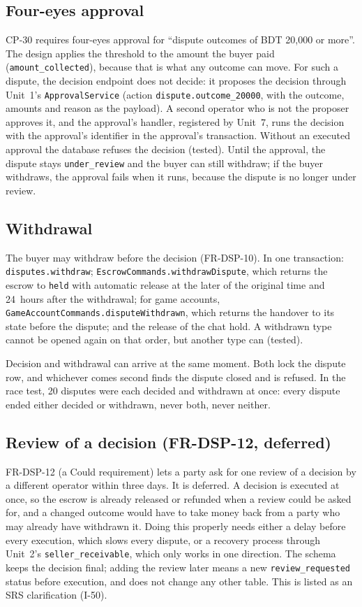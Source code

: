 \documentclass[11pt,a4paper]{article}
\begin{document}
\subsection{Four-eyes approval}
\label{sec:foureyes}
CP-30 requires four-eyes approval for ``dispute outcomes of BDT 20{,}000 or more''. The design applies the threshold to the amount the buyer paid (\texttt{amount\_collected}), because that is what any outcome can move. For such a dispute, the decision endpoint does not decide: it proposes the decision through Unit~1's \texttt{ApprovalService} (action \texttt{dispute.outcome\_20000}, with the outcome, amounts and reason as the payload). A second operator who is not the proposer approves it, and the approval's handler, registered by Unit~7, runs the decision with the approval's identifier in the approval's transaction. Without an executed approval the database refuses the decision (tested). Until the approval, the dispute stays \texttt{under\_review} and the buyer can still withdraw; if the buyer withdraws, the approval fails when it runs, because the dispute is no longer under review.

\subsection{Withdrawal}
The buyer may withdraw before the decision (FR-DSP-10). In one transaction: \texttt{disputes.withdraw}; \texttt{EscrowCommands.\allowbreak withdrawDispute}, which returns the escrow to \texttt{held} with automatic release at the later of the original time and 24~hours after the withdrawal; for game accounts, \texttt{GameAccountCommands.disputeWithdrawn}, which returns the handover to its state before the dispute; and the release of the chat hold. A withdrawn type cannot be opened again on that order, but another type can (tested).

Decision and withdrawal can arrive at the same moment. Both lock the dispute row, and whichever comes second finds the dispute closed and is refused. In the race test, 20 disputes were each decided and withdrawn at once: every dispute ended either decided or withdrawn, never both, never neither.

\subsection{Review of a decision (FR-DSP-12, deferred)}
\label{sec:review}
FR-DSP-12 (a Could requirement) lets a party ask for one review of a decision by a different operator within three days. It is deferred. A decision is executed at once, so the escrow is already released or refunded when a review could be asked for, and a changed outcome would have to take money back from a party who may already have withdrawn it. Doing this properly needs either a delay before every execution, which slows every dispute, or a recovery process through Unit~2's \texttt{seller\_receivable}, which only works in one direction. The schema keeps the decision final; adding the review later means a new \texttt{review\_requested} status before execution, and does not change any other table. This is listed as an SRS clarification (I-50).
\end{document}
